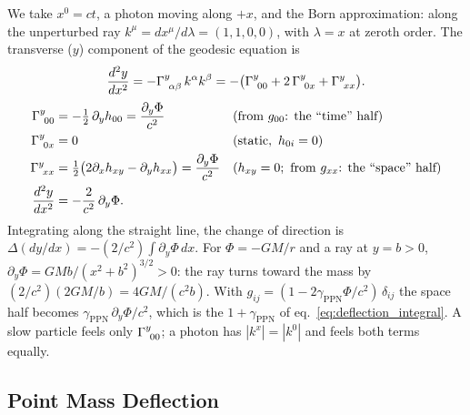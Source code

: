 \begin{derivation}
We take $x^0 = ct$, a photon moving along $+x$, and the Born approximation:
along the unperturbed ray $k^\mu = dx^\mu/d\lambda = (1, 1, 0, 0)$, with
$\lambda = x$ at zeroth order.  The transverse ($y$) component of the
geodesic equation is
\[
\frac{d^2y}{dx^2} = -\Gamma^{y}_{\ \alpha \beta}\,k^\alpha k^\beta
= -\bigl(\Gamma^{y}_{\ 0 0} + 2\,\Gamma^{y}_{\ 0 x} + \Gamma^{y}_{\ x x}\bigr) .
\]
\begin{align*}
\Gamma^{y}_{\ 0 0} &= -\tfrac12\,\partial_y h_{00} = \frac{\partial_y\Phi}{c^2}
  && \text{(from } g_{00}\text{: the ``time'' half)} \\
\Gamma^{y}_{\ 0 x} &= 0
  && (\text{static},\ h_{0i} = 0) \\
\Gamma^{y}_{\ x x} &= \tfrac12\bigl(2\partial_x h_{xy} - \partial_y h_{xx}\bigr)
  = \frac{\partial_y\Phi}{c^2}
  && (h_{xy} = 0;\ \text{from } g_{xx}\text{: the ``space'' half}) \\
\frac{d^2y}{dx^2} &= -\frac{2}{c^2}\,\partial_y\Phi .
\end{align*}
Integrating along the straight line, the change of direction is
$\Delta(dy/dx) = -(2/c^2)\int\partial_y\Phi\,dx$.  For $\Phi = -GM/r$ and a ray
at $y = b > 0$, $\partial_y\Phi = GMb/(x^2 + b^2)^{3/2} > 0$: the ray turns
toward the mass by $(2/c^2)(2GM/b) = 4GM/(c^2b)$.  With
$g_{ij} = (1 - 2\gamma_{\mathrm{PPN}}\Phi/c^2)\,\delta_{ij}$ the space half
becomes $\gamma_{\mathrm{PPN}}\,\partial_y\Phi/c^2$, which is the
$1 + \gamma_{\mathrm{PPN}}$ of eq.~\eqref{eq:deflection_integral}.  A slow
particle feels only $\Gamma^{y}_{\ 0 0}$; a photon has $|k^x| = |k^0|$
and feels both terms equally.
\end{derivation}


\subsection{Point Mass Deflection}

